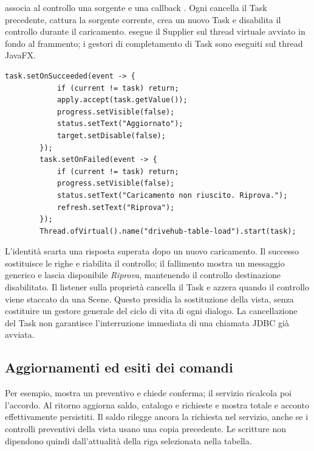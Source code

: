  associa al controllo una sorgente  e una
callback . Ogni  cancella il Task precedente,
cattura la sorgente corrente, crea un nuovo Task e disabilita il controllo
durante il caricamento.  esegue il Supplier sul thread virtuale
avviato in fondo al frammento; i gestori di completamento di Task sono
eseguiti sul thread JavaFX.

\noindent\begin{minipage}{\linewidth}
\begin{lstlisting}[firstnumber=60,caption={\code{AsyncLoad.java}: pubblicazione del risultato corrente e stato di errore.},
  label=lst:async]
        task.setOnSucceeded(event -> {
            if (current != task) return;
            apply.accept(task.getValue());
            progress.setVisible(false);
            status.setText("Aggiornato");
            target.setDisable(false);
        });
        task.setOnFailed(event -> {
            if (current != task) return;
            progress.setVisible(false);
            status.setText("Caricamento non riuscito. Riprova.");
            refresh.setText("Riprova");
        });
        Thread.ofVirtual().name("drivehub-table-load").start(task);
\end{lstlisting}
\end{minipage}


L'identità  scarta una risposta superata dopo un
nuovo caricamento. Il successo sostituisce le righe e riabilita il
controllo; il fallimento mostra un messaggio generico e lascia disponibile
\emph{Riprova}, mantenendo il controllo destinazione disabilitato.
Il listener sulla proprietà  cancella il Task e azzera
 quando il controllo viene staccato da una Scene.
Questo presidia la sostituzione della vista, senza costituire un gestore
generale del ciclo di vita di ogni dialogo. La cancellazione del Task
non garantisce l'interruzione immediata di una chiamata JDBC già avviata.

\subsection{Aggiornamenti ed esiti dei comandi}
Per esempio,  mostra un preventivo e chiede
conferma; il servizio ricalcola poi l'accordo. Al ritorno aggiorna saldo,
catalogo e richieste e mostra totale e acconto effettivamente persistiti.
Il saldo rilegge ancora la richiesta nel servizio, anche se i controlli
preventivi della vista usano una copia precedente. Le scritture non
dipendono quindi dall'attualità della riga selezionata nella tabella.


